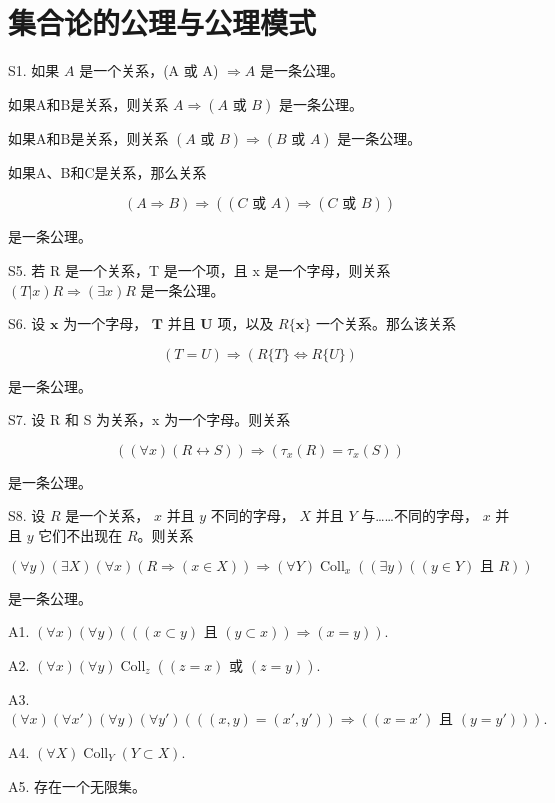 \section*{集合论的公理与公理模式}
{}

S1. 如果 \(A\) 是一个关系，(A 或 A) \(\Longrightarrow A\) 是一条公理。

如果A和B是关系，则关系 \(A \Longrightarrow (A \text{ 或 } B)\) 是一条公理。

如果A和B是关系，则关系 \((A \text{ 或 } B) \Longrightarrow (B \text{ 或 } A)\) 是一条公理。

如果A、B和C是关系，那么关系

\[
(A \Rightarrow B) \Rightarrow ((C \text {   或   } A) \Rightarrow (C \text {   或   } B))
\]

是一条公理。

S5. 若 R 是一个关系，T 是一个项，且 x 是一个字母，则关系 \((T|x)R \Longrightarrow (\exists x)R\) 是一条公理。

S6. 设 \(\pmb{x}\) 为一个字母， \(\pmb{T}\) 并且 \(\pmb{U}\) 项，以及 \(R\{\pmb{x}\}\) 一个关系。那么该关系

\[
(T = U) \Longrightarrow (R \{T \} \Longleftrightarrow R \{U \})
\]

是一条公理。

S7. 设 R 和 S 为关系，x 为一个字母。则关系

\[
((\forall x) (R \leftrightarrow S)) \Longrightarrow (\tau_ {x} (R) = \tau_ {x} (S))
\]

是一条公理。

S8. 设 \(R\) 是一个关系， \(x\) 并且 \(y\) 不同的字母， \(X\) 并且 \(Y\) 与……不同的字母， \(x\) 并且 \(y\) 它们不出现在 \(R\)。则关系

\[
(\forall y)(\exists X)(\forall x)(R \Longrightarrow (x \in X)) \Longrightarrow (\forall Y)\operatorname{Coll}_x((\exists y)((y \in Y) \text{ 且 } R))
\]

是一条公理。

A1. \((\forall x)(\forall y)(((x\subset y)\text{ 且 }(y\subset x))\Longrightarrow (x = y)).\)

A2. \((\forall x)(\forall y)\operatorname{Coll}_z((z = x)\text{ 或 }(z = y)).\)

A3. \((\forall x)(\forall x')(\forall y)(\forall y')(((x, y) = (x', y')) \Longrightarrow ((x = x')\text{ 且 }(y = y'))).\)

A4. \((\forall X)\operatorname{Coll}_{Y}(Y \subset X).\)

A5. 存在一个无限集。
